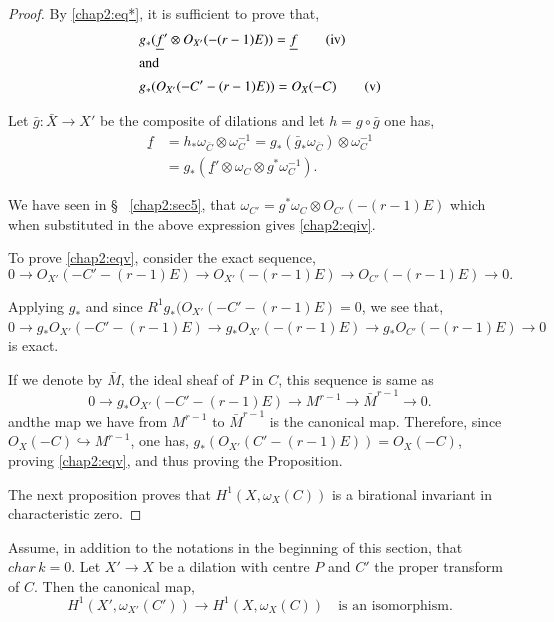 \begin{proof}
By \eqref{chap2:eq*}, it is sufficient to prove that, 
\begin{align*}
& g_*(\underline{f}'\otimes O_{X'}(-(r-1)E))=
  \underline{f}\tag{iv}\label{chap2:eqiv}\\
\intertext{and}
& g_*(O_{X'}(-C'-(r-1)E))=O_X(-C)\tag{v}\label{chap2:eqv}
\end{align*}

Let $\bar{g}:\bar{X}\longrightarrow X'$ be the composite of dilations
and let $h=g\circ\bar{g}$ one has,
\begin{align*}
\underline{f} &= h_*\omega_{\bar{C}}\otimes\omega_C^{-1}=g_*(\bar{g}_*
\omega_{\bar{C}})\otimes\omega_C^{-1}\\
&= g_*(\underline{f}'\otimes\omega_C\otimes g^*\omega_C^{-1}).
\end{align*}

We have seen in \S~ \ref{chap2:sec5}, that $\omega_{C'}=g^*\omega_C
\otimes O_{C'}(-(r-1)E)$ which when substituted in the above
expression gives \eqref{chap2:eqiv}. 

To prove \eqref{chap2:eqv}, consider the exact sequence,
$$
0\longrightarrow O_{X'}(-C'-(r-1)E)\longrightarrow O_{X'}(-(r-1)E)
\longrightarrow O_{C'}(-(r-1)E)\longrightarrow 0. 
$$

Applying $g_*$ and since $R^1g_*(O_{X'}(-C'-(r-1)E)=0$, we see that,
$0\longrightarrow g_*O_{X'}(-C'-(r-1)E)\longrightarrow
g_*O_{X'}(-(r-1)E)\longrightarrow g_*O_{C'}(-(r-1)E)\longrightarrow 0$
is exact.

If we denote by $\bar{M}$, the ideal sheaf of $P$ in $C$, this
sequence is same as 
$$
0\longrightarrow g_*O_{X'}(-C'-(r-1)E)\longrightarrow
M^{r-1}\longrightarrow\bar{M}^{r-1}\longrightarrow 0.
$$
and\pageoriginale the map we have from $M^{r-1}$ to $\bar{M}^{r-1}$ is
the canonical map. Therefore, since $O_X(-C)\hookrightarrow M^{r-1}$,
one has, $g_*(O_{X'}(C'-(r-1)E))=O_X(-C)$, proving \eqref{chap2:eqv},
and thus proving the Proposition.

The next proposition proves that $H^1(X,\omega_X(C))$ is a birational
invariant in characteristic zero.
\end{proof}

\begin{Prop*}
Assume, in addition to the notations in the beginning of this section,
that $char\,k = 0$. Let $X'\longrightarrow X$ be a dilation with centre
$P$ and $C'$ the proper transform of $C$. Then the canonical map,
$$
H^1(X',\omega_{X'}(C'))\to H^1(X,\omega_X(C))\quad\text{is an
isomorphism}.
$$
\end{Prop*}


